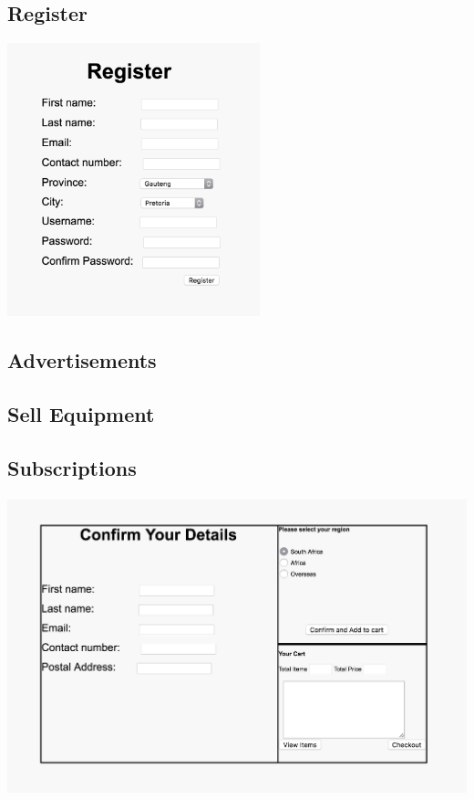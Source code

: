 \documentclass[11pt]{article}
\begin{document}
	\subsection{Register}
		\includegraphics[width=0.55\textwidth]{../Images/Register}
	\subsection{Advertisements}
	\subsection{Sell Equipment}
	\subsection{Subscriptions}
	\includegraphics[width=\textwidth]{../Images/Subscriptions}
\end{document}
